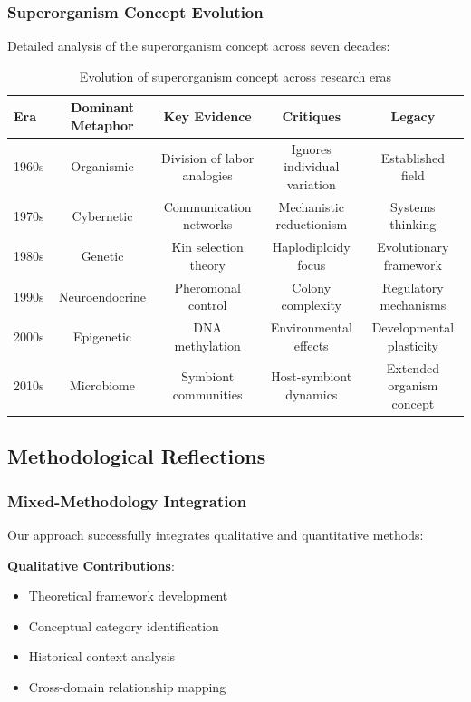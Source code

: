\documentclass[
]{article}
\providecommand{\tightlist}{%
  \setlength{\itemsep}{0pt}\setlength{\parskip}{0pt}}
\numberwithin{equation}{section}
\begin{document}
\subsubsection{Superorganism Concept
Evolution}\label{superorganism-concept-evolution}

Detailed analysis of the superorganism concept across seven decades:

\begin{table}[h]
\centering
\begin{tabular}{|l|c|c|c|c|}
\hline
\textbf{Era} & \textbf{Dominant Metaphor} & \textbf{Key Evidence} & \textbf{Critiques} & \textbf{Legacy} \\
\hline
1960s & Organismic & Division of labor analogies & Ignores individual variation & Established field \\
1970s & Cybernetic & Communication networks & Mechanistic reductionism & Systems thinking \\
1980s & Genetic & Kin selection theory & Haplodiploidy focus & Evolutionary framework \\
1990s & Neuroendocrine & Pheromonal control & Colony complexity & Regulatory mechanisms \\
2000s & Epigenetic & DNA methylation & Environmental effects & Developmental plasticity \\
2010s & Microbiome & Symbiont communities & Host-symbiont dynamics & Extended organism concept \\
\hline
\end{tabular}
\caption{Evolution of superorganism concept across research eras}
\label{tab:superorganism_concept_evolution}
\end{table}

\subsection{Methodological
Reflections}\label{methodological-reflections}

\subsubsection{Mixed-Methodology
Integration}\label{mixed-methodology-integration}

Our approach successfully integrates qualitative and quantitative
methods:

\textbf{Qualitative Contributions}:

\begin{itemize}
\tightlist
\item
  Theoretical framework development
\item
  Conceptual category identification
\item
  Historical context analysis
\item
  Cross-domain relationship mapping
\end{itemize}
\end{document}
